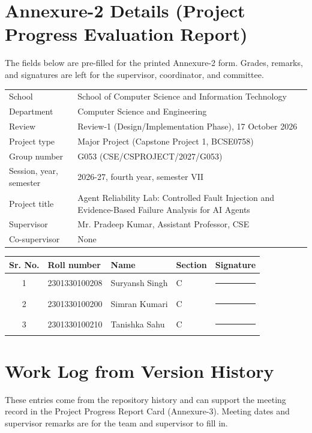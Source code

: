 \documentclass[12pt,a4paper,oneside]{report}
\begin{document}
\appendix
\chapter{Annexure-2 Details (Project Progress Evaluation Report)}
The fields below are pre-filled for the printed Annexure-2 form. Grades, remarks, and
signatures are left for the supervisor, coordinator, and committee.

\begin{table}[H]
\centering
\begin{tabularx}{\linewidth}{lY}
\toprule
School & School of Computer Science and Information Technology \\
Department & Computer Science and Engineering \\
Review & Review-1 (Design/Implementation Phase), 17 October 2026 \\
Project type & Major Project (Capstone Project 1, BCSE0758) \\
Group number & G053 (CSE/CSPROJECT/2027/G053) \\
Session, year, semester & 2026-27, fourth year, semester VII \\
Project title & Agent Reliability Lab: Controlled Fault Injection and Evidence-Based Failure Analysis for AI Agents \\
Supervisor & Mr. Pradeep Kumar, Assistant Professor, CSE \\
Co-supervisor & None \\
\bottomrule
\end{tabularx}
\end{table}

\begin{table}[H]
\centering
\begin{tabular}{clllc}
\toprule
\textbf{Sr. No.} & \textbf{Roll number} & \textbf{Name} & \textbf{Section} & \textbf{Signature} \\
\midrule
1 & 2301330100208 & Suryansh Singh & C & \rule{2.5cm}{0.4pt} \\
2 & 2301330100200 & Simran Kumari & C & \rule{2.5cm}{0.4pt} \\
3 & 2301330100210 & Tanishka Sahu & C & \rule{2.5cm}{0.4pt} \\
\bottomrule
\end{tabular}
\end{table}

\chapter{Work Log from Version History}
These entries come from the repository history and can support the meeting record in
the Project Progress Report Card (Annexure-3). Meeting dates and supervisor remarks are
for the team and supervisor to fill in.
\end{document}
